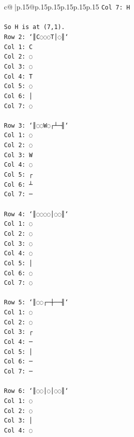 \documentclass{article}
\begin{document}
{\begin{supertabular}{c@{$\;$}|p{.15\linewidth}@{}p{.15\linewidth}p{.15\linewidth}p{.15\linewidth}p{.15\linewidth}p{.15\linewidth}}
{{{\texttt{Col 7: H} \\
\\ 
\texttt{So H is at (7,1).} \\
\texttt{Row 2: `║C◌◌◌T│◌║`} \\
\texttt{Col 1: C} \\
\texttt{Col 2: ◌} \\
\texttt{Col 3: ◌} \\
\texttt{Col 4: T} \\
\texttt{Col 5: ◌} \\
\texttt{Col 6: │} \\
\texttt{Col 7: ◌} \\
\\ 
\texttt{Row 3: `║◌◌W◌┌┴─╢`} \\
\texttt{Col 1: ◌} \\
\texttt{Col 2: ◌} \\
\texttt{Col 3: W} \\
\texttt{Col 4: ◌} \\
\texttt{Col 5: ┌} \\
\texttt{Col 6: ┴} \\
\texttt{Col 7: ─} \\
\\ 
\texttt{Row 4: `║◌◌◌◌│◌◌║`} \\
\texttt{Col 1: ◌} \\
\texttt{Col 2: ◌} \\
\texttt{Col 3: ◌} \\
\texttt{Col 4: ◌} \\
\texttt{Col 5: │} \\
\texttt{Col 6: ◌} \\
\texttt{Col 7: ◌} \\
\\ 
\texttt{Row 5: `║◌◌┌─┼──╢`} \\
\texttt{Col 1: ◌} \\
\texttt{Col 2: ◌} \\
\texttt{Col 3: ┌} \\
\texttt{Col 4: ─} \\
\texttt{Col 5: │} \\
\texttt{Col 6: ─} \\
\texttt{Col 7: ─} \\
\\ 
\texttt{Row 6: `║◌◌│◌│◌◌║`} \\
\texttt{Col 1: ◌} \\
\texttt{Col 2: ◌} \\
\texttt{Col 3: │} \\
\texttt{Col 4: ◌} \\
}}}
\end{supertabular}}
\end{document}
